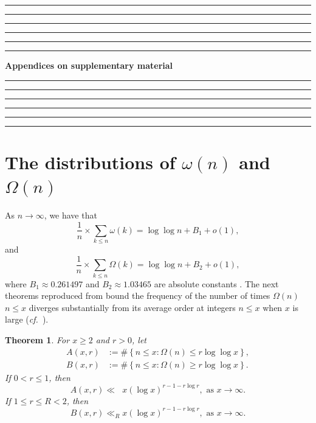 \documentclass[11pt,reqno,a4letter]{article}
\numberwithin{equation}{section}
\numberwithin{figure}{section}
\numberwithin{table}{section}
\newcommand{\cf}{\textit{cf.\ }}
\theoremstyle{plain}
\newtheorem{theorem}{Theorem}
\numberwithin{theorem}{section}
\theoremstyle{definition}
\begin{document}
\appendix
{}
\setcounter{section}{0} 
\renewcommand{\thesection}{\Alph{section}} 

\smallskip\hrule\hrule\hrule\hrule\hrule\hrule\smallskip
{\huge{\textbf{Appendices on supplementary material}}} 
\medskip\hrule\hrule\hrule\hrule\hrule\hrule\smallskip

%

\section{The distributions of $\omega(n)$ and $\Omega(n)$} 
\label{subSection_TheKnownDistsOfThePrimeOmegaFunctions_IntroResults_v1} 

As $n \rightarrow \infty$, we have that 
$$\frac{1}{n} \times \sum_{k \leq n} \omega(k) = \log\log n + B_1 + o(1),$$ 
and 
$$\frac{1}{n} \times \sum_{k \leq n} \Omega(k) = \log\log n + B_2 + o(1),$$ 
where $B_1 \approx 0.261497$ and $B_2 \approx 1.03465$ are 
absolute constants \cite[\S 22.10]{HARDYWRIGHT}. 
The next theorems reproduced from \cite[\S 7.4]{MV} bound the frequency of the 
number of times $\Omega(n)$ $n \leq x$ 
diverges substantially from its average order at integers $n \leq x$ 
when $x$ is large 
(\cf \cite{ERDOS-KAC-REF,BILLINGSLY-CLT-PRIMEDIVFUNC}). 

\begin{theorem} 
\label{theorem_MV_Thm7.20-init_stmt} 
For $x \geq 2$ and $r > 0$, let 
\begin{align*} 
A(x, r) & := \#\left\{n \leq x: \Omega(n) \leq r \log\log x\right\}, \\ 
B(x, r) & := \#\left\{n \leq x: \Omega(n) \geq r \log\log x\right\}. 
\end{align*} 
If $0 < r \leq 1$, then 
\[
A(x, r) \ll\phantom{_R} x (\log x)^{r-1 - r\log r}, \text{ as } x \rightarrow \infty. 
\]
If $1 \leq r \leq R < 2$, then 
\[
B(x, r) \ll_R x (\log x)^{r-1-r \log r}, \text{ as } x \rightarrow \infty. 
\]
\end{theorem} 
\end{document}
